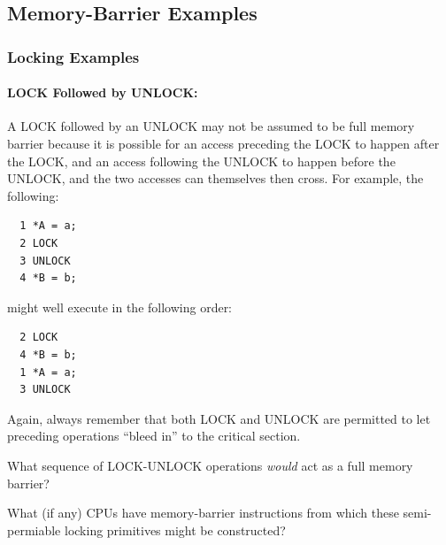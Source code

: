 \subsection{Memory-Barrier Examples}
\label{sec:advsync:Memory-Barrier Examples}

\subsubsection{Locking Examples}

\paragraph{LOCK Followed by UNLOCK:}
A LOCK followed by an UNLOCK may not be assumed to be full memory barrier
because it is possible for an access preceding the LOCK to happen after the
LOCK, and an access following the UNLOCK to happen before the UNLOCK, and the
two accesses can themselves then cross.
For example, the following:

\vspace{5pt}
\begin{minipage}[t]{\columnwidth}
\small
\begin{verbatim}
  1 *A = a;
  2 LOCK
  3 UNLOCK
  4 *B = b;
\end{verbatim}
\end{minipage}
\vspace{5pt}

might well execute in the following order:

\vspace{5pt}
\begin{minipage}[t]{\columnwidth}
\small
\begin{verbatim}
  2 LOCK
  4 *B = b;
  1 *A = a;
  3 UNLOCK
\end{verbatim}
\end{minipage}
\vspace{5pt}

Again, always remember that both LOCK and UNLOCK are permitted to let
preceding operations ``bleed in'' to the critical section.

\QuickQuiz{}
	What sequence of LOCK-UNLOCK operations \emph{would}
	act as a full memory barrier?
 \QuickQuizEnd

\QuickQuiz{}
	What (if any) CPUs have memory-barrier instructions
	from which these semi-permiable locking primitives might
	be constructed?
 \QuickQuizEnd

